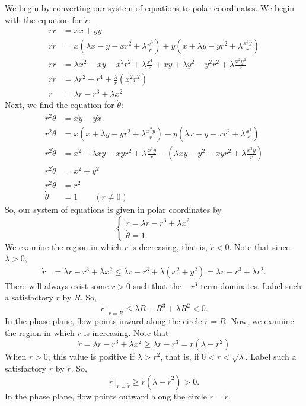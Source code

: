 \documentclass[10pt,letterpaper]{report}
\begin{document}
\begin{enumerate}
We begin by converting our system of equations to polar coordinates. We begin with the equation for $\dot r:$
\begin{align*}
    r \dot r &= x \dot x + y \dot y \\
    r \dot r &= x\left(\lambda x - y - xr^2 + \lambda \frac{x^3}{r}\right) + y\left(x + \lambda y - yr^2 + \lambda \frac{x^2 y}{r}\right)
    \\
    r \dot r &= \lambda x^2 - xy - x^2r^2 + \lambda \frac{x^4}{r} + xy + \lambda y^2 - y^2r^2 + \lambda \frac{x^2 y^2}{r}
    \\
    r \dot r &= \lambda r^2 - r^4 + \frac \lambda  r \left( x^2 r^2\right)
    \\
    \dot r &= \lambda r - r^3 + \lambda x^2
\end{align*}
Next, we find the equation for $\dot \theta:$
\begin{align*}
    r^2 \dot \theta &= x\dot y - y \dot x
    \\
    r^2 \dot \theta &= x\left(x + \lambda y - yr^2 + \lambda \frac{x^2 y}{r}\right) - y\left(\lambda x - y - xr^2 + \lambda \frac{x^3}{r}\right)
    \\
    r^2 \dot \theta &= x^2 + \lambda xy - xyr^2 + \lambda \frac{x^3 y}{r} - \left(\lambda xy - y^2 - xyr^2 + \lambda \frac{x^3y}{r}\right)
    \\
    r^2 \dot \theta &= x^2 + y^2
    \\
    r^2 \dot \theta &= r^2 \\
    \dot \theta &= 1 \qquad (r \ne 0)
\end{align*}
So, our system of equations is given in polar coordinates by
\[
\begin{cases}
\dot r = \lambda r - r^3 + \lambda x^2
\\
\dot \theta = 1.
\end{cases}
\]
We examine the region in which $r$ is decreasing, that is, $\dot r < 0$. Note that since $\lambda > 0$,
\begin{align*}
    \dot r &=
    \lambda r - r^3 + \lambda x^2 
    \leq \lambda r - r^3 + \lambda \left(x^2 + y^2\right) 
    = \lambda r - r^3 + \lambda r^2.
\end{align*}
There will always exist some $r > 0$ such that the $-r^3$ term dominates. Label such a satisfactory $r$ by $R$. So,
\[
\dot r\ \big \vert_{r = R} \leq \lambda R - R^3 + \lambda R^2 < 0.
\]
In the phase plane, flow points inward along the circle $r = R$. Now, we examine the region in which $r$ is increasing. Note that
\[
\dot r = \lambda r - r^3 + \lambda x^2 \geq \lambda r - r^3 = r\left(\lambda - r^2\right)
\]
When $r > 0$, this value is positive if $\lambda > r^2$, that is, if $0 < r < \sqrt{ \lambda}$. Label such a satisfactory $r$ by $\widetilde{r}$. So,
\[
\dot r\ \big \vert_{r = \widetilde{r}} \geq \widetilde{r}\left(\lambda - \widetilde{r}^2\right) > 0.
\]
In the phase plane, flow points outward along the circle $r = \widetilde{r}$. 


\end{enumerate}
\end{document}
